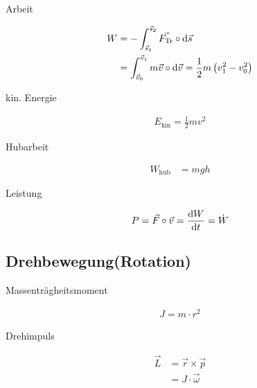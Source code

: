 \begin{boxleft}Arbeit
\end{boxleft}\begin{boxrightshaded}
\begin{align}
W&=-\int_{\vec{s}_1}^{\vec{s}_2}\vec{F_{\text{Tr}}}\circ\mathop{}\!\mathrm{d} \vec{s}\\
&=\int_{\vec{v}_0}^{\vec{v}_1}m\vec{v}\circ\mathop{}\!\mathrm{d} \vec{v}=\frac{1}{2}m\left(v_1^2-v_0^2\right) 
\end{align}
\end{boxrightshaded}

\begin{boxleft}kin. Energie
\end{boxleft}\begin{boxrightshaded}
\begin{align}
E_{\text{kin}}=\frac{1}{2}mv^2
\end{align}
\end{boxrightshaded}


\begin{boxleft}Hubarbeit
\end{boxleft}\begin{boxrightshaded}
\begin{align}
W_{\text{hub}}&=mgh
\end{align}
\end{boxrightshaded}

\begin{boxleft}Leistung
\end{boxleft}\begin{boxrightshaded}
\begin{align}
P=\vec{F}\circ\vec{v}=\frac{\mathop{}\!\mathrm{d} W}{\mathop{}\!\mathrm{d} t}=\dot{W}
\end{align}
\end{boxrightshaded}


\subsection{Drehbewegung(Rotation)}

\begin{boxleft}Massenträgheitsmoment
\end{boxleft}\begin{boxrightshaded}
\begin{align}
J=m\cdot r^2
\end{align}
\end{boxrightshaded}

\begin{boxleft}Drehimpuls
\end{boxleft}\begin{boxrightshaded}
\begin{align}
\vec{L}&=\vec{r}\times\vec{p} \\
&=J\cdot \vec{\omega}
\end{align}
\end{boxrightshaded}

